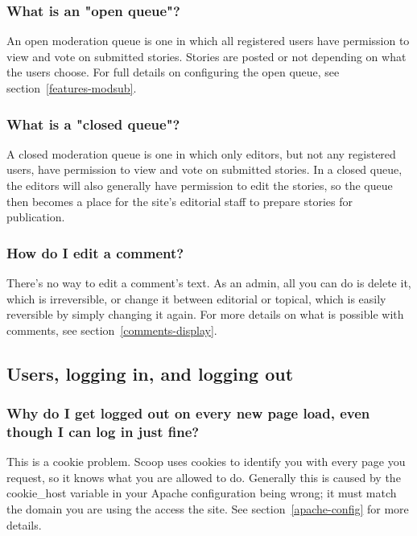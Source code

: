 \subsubsection{What is an "open queue"?}

An open moderation queue is one in which all registered users have permission to view and vote on submitted stories. Stories are posted or not depending on what the users choose. For full details on configuring the open queue, see section~\ref{features-modsub}.

\subsubsection{What is a "closed queue"?}

A closed moderation queue is one in which only editors, but not any registered users, have permission to view and vote on submitted stories. In a closed queue, the editors will also generally have permission to edit the stories, so the queue then becomes a place for the site's editorial staff to prepare stories for publication.

\subsubsection{How do I edit a comment?}

There's no way to edit a comment's text. As an admin, all you can do is delete it, which is irreversible, or change it between editorial or topical, which is easily reversible by simply changing it again. For more details on what is possible with comments, see section~\ref{comments-display}.

\subsection{Users, logging in, and logging out}

\subsubsection{Why do I get logged out on every new page load, even though I can log in just fine?}

This is a cookie problem. Scoop uses cookies to identify you with every page you request, so it knows what you are allowed to do. Generally this is caused by the cookie\_host variable in your Apache configuration being wrong; it must match the domain you are using the access the site. See section~\ref{apache-config} for more details.

